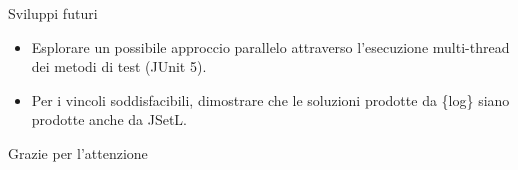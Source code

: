 \documentclass{beamer}
\begin{document}
\begin{frame}{Sviluppi futuri}
\begin{block}{}
        \begin{itemize}
        \setlength\itemsep{2em}
        \item Esplorare un possibile approccio parallelo attraverso l'esecuzione multi-thread dei metodi di test (JUnit 5).
        \item Per i vincoli soddisfacibili, dimostrare che le soluzioni prodotte da \{log\} siano prodotte anche da JSetL.
		\end{itemize} 
\end{block}
\end{frame}

\begin{frame}{  }
\centering \huge Grazie per l'attenzione
\end{frame}
\end{document}
